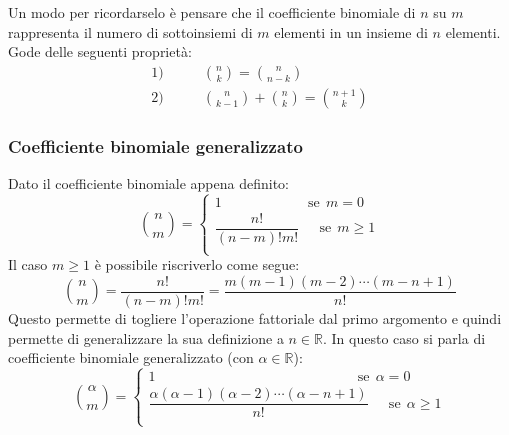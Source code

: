 
Un modo per ricordarselo è pensare che il coefficiente binomiale di $n$ su $m$ rappresenta il numero di sottoinsiemi di $m$ elementi in un insieme di $n$ elementi.\\
Gode delle seguenti proprietà:
\begin{align*}
    1) &\qquad\binom{n}{k} = \binom{n}{n-k}\\[0.2cm]
    2) &\qquad\binom{n}{k-1} + \binom{n}{k} = \binom{n+1}{k}
\end{align*}

\subsubsection{Coefficiente binomiale generalizzato} \label{sec_coefficiente-binomiale-gen}
Dato il coefficiente binomiale appena definito:
\begin{equation*}
\binom{n}{m}=
    \begin{cases}
    1 \qquad \qquad \qquad \, \mathrm{se}\;\, m = 0\\
    \dfrac{n!}{(n-m)!m!} \quad \;\, \mathrm{se}\;\, m \geq 1\\
    \end{cases}
\end{equation*}
Il caso $m \geq 1$ è possibile riscriverlo come segue:
\begin{equation*}
	\binom{n}{m} = \dfrac{n!}{(n-m)!m!} = \dfrac{m (m - 1) (m -2) \cdots (m - n + 1)}{n!}
\end{equation*}
Questo permette di togliere l'operazione fattoriale dal primo argomento e quindi permette di generalizzare la sua definizione a $n \in \mathbb{R}$. In questo caso si parla di coefficiente binomiale generalizzato (con $\alpha \in \mathbb{R}$):
\begin{equation*}
	\binom{\alpha}{m} = 
		\begin{cases}
			1 \qquad \qquad \qquad \qquad \qquad \qquad \qquad \,\; \mathrm{se}\;\, \alpha = 0\\[5pt]
		\dfrac{\alpha (\alpha - 1) (\alpha -2) \cdots (\alpha - n + 1)}{n!} \quad \;\, \mathrm{se}\;\, \alpha \geq 1\\
		\end{cases}
\end{equation*}



